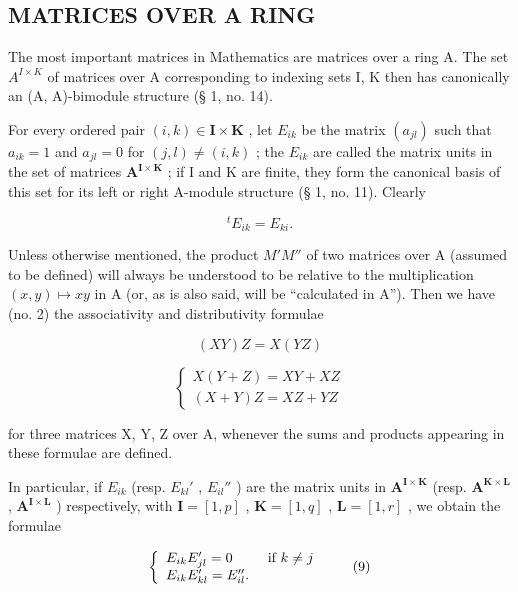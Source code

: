 \subsection{MATRICES OVER A RING}

The most important matrices in Mathematics are matrices over a ring A. The set \(A^{I \times K}\) of matrices over A corresponding to indexing sets I, K then has canonically an (A, A)-bimodule structure (§ 1, no. 14).

For every ordered pair \((i,k)\in\mathbf{I}\times\mathbf{K}\) , let \(E_{ik}\) be the matrix \((a_{jl})\) such that \(a_{ik}=1\) and \(a_{jl}=0\) for \((j,l)\neq(i,k)\) ; the \(E_{ik}\) are called the matrix units in the set of matrices \(\mathbf{A}^{\mathbf{I}\times\mathbf{K}}\) ; if I and K are finite, they form the canonical basis of this set for its left or right A-module structure (§ 1, no. 11). Clearly

\[
{ } ^ { t } E _ { i k } = E _ { k i } .
\]

Unless otherwise mentioned, the product \(M'M''\) of two matrices over A (assumed to be defined) will always be understood to be relative to the multiplication \((x,y)\mapsto xy\) in A (or, as is also said, will be ``calculated in A''). Then we have (no. 2) the associativity and distributivity formulae

\[
(X Y) Z = X (Y Z)\tag{7}
\]

\[
\left\{ \begin{array}{l} X (Y + Z) = X Y + X Z \\ (X + Y) Z = X Z + Y Z \end{array} \right.\tag{8}
\]

for three matrices X, Y, Z over A, whenever the sums and products appearing in these formulae are defined.

In particular, if \(E_{ik}\) (resp. \(E_{kl}'\) , \(E_{il}''\) ) are the matrix units in \(\mathbf{A}^{\mathbf{I} \times \mathbf{K}}\) (resp. \(\mathbf{A}^{\mathbf{K} \times \mathbf{L}}\) , \(\mathbf{A}^{\mathbf{I} \times \mathbf{L}}\) ) respectively, with \(\mathbf{I} = [1, p]\) , \(\mathbf{K} = [1, q]\) , \(\mathbf{L} = [1, r]\) , we obtain the formulae

\[
\left\{ \begin{array}{l l} E _ {i k} E _ {j l} ^ {\prime} = 0 & \text { if } k \neq j \\ E _ {i k} E _ {k l} ^ {\prime} = E _ {i l} ^ {\prime \prime}. \end{array} \right.\tag{9}
\]

